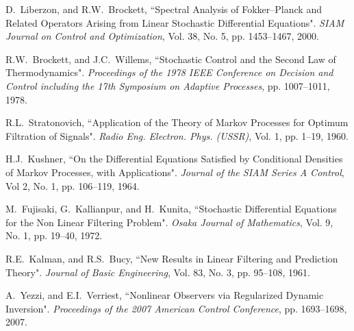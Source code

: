 \documentclass[letterpaper,10pt,twocolumn,conference]{ieeeconf}
\newcommand{\blue}{\textcolor{blue}}
\begin{document}
\begin{thebibliography}{99}
D.~Liberzon, and R.W.~Brockett, ``Spectral Analysis of Fokker--Planck and Related Operators Arising from Linear Stochastic Differential Equations". \emph{SIAM Journal on Control and Optimization}, Vol. 38, No. 5, pp. 1453--1467, 2000.

R.W.~Brockett, and J.C.~Willems, ``Stochastic Control and the Second Law of Thermodynamics". \emph{Proceedings of the 1978 IEEE Conference on Decision and Control including the 17th Symposium on Adaptive Processes}, pp. 1007--1011, 1978.



R.L.~Stratonovich, ``Application of the Theory of Markov Processes for Optimum Filtration of Signals". \emph{Radio Eng. Electron. Phys. (USSR)}, Vol. 1, pp. 1--19, 1960.

H.J.~Kushner, ``On the Differential Equations Satisfied by Conditional Densities of Markov Processes, with Applications". \emph{Journal of the SIAM Series A Control}, Vol 2, No. 1, pp. 106--119, 1964. 


M.~Fujisaki, G.~Kallianpur, and H.~Kunita, ``Stochastic Differential Equations for the Non Linear Filtering Problem". \emph{Osaka Journal of Mathematics}, Vol. 9, No. 1, pp. 19--40, 1972.

R.E.~Kalman, and R.S.~Bucy, ``New Results in Linear Filtering and Prediction Theory". \emph{Journal of Basic Engineering}, Vol. 83, No. 3, pp. 95--108, 1961. 




A.~Yezzi, and E.I.~Verriest, ``Nonlinear Observers via Regularized Dynamic Inversion". \emph{Proceedings of the 2007 American Control Conference}, pp. 1693--1698, 2007.


\end{thebibliography}
\end{document}
